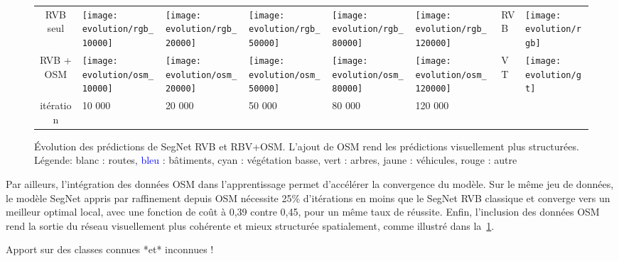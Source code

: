 \begin{figure}
\centering
\begin{tabularx}{0.95\textwidth}{c Y Y Y Y Y Y Y}
RVB seul &
\texttt{[image: evolution/rgb\_10000]} &
\texttt{[image: evolution/rgb\_20000]} &
\texttt{[image: evolution/rgb\_50000]} &
\texttt{[image: evolution/rgb\_80000]} &
\texttt{[image: evolution/rgb\_120000]} &
RVB &
\texttt{[image: evolution/rgb]} \\
RVB + OSM &
\texttt{[image: evolution/osm\_10000]} &
\texttt{[image: evolution/osm\_20000]} &
\texttt{[image: evolution/osm\_50000]} &
\texttt{[image: evolution/osm\_80000]} &
\texttt{[image: evolution/osm\_120000]} &
VT &
\texttt{[image: evolution/gt]} \\
itération & 10 000 & 20 000 & 50 000 & 80 000 & 120 000\\
\end{tabularx}
\caption{Évolution des prédictions de SegNet RVB et RBV+OSM. L'ajout de OSM rend les prédictions visuellement plus structurées.
\small{Légende: blanc : routes, \textcolor{Blue}{bleu} : bâtiments, \textcolor{Cerulean}{cyan} : végétation basse, \textcolor{OliveGreen}{vert} : arbres, \textcolor{Dandelion}{jaune} : véhicules, \textcolor{BrickRed}{rouge} : autre}}
\label{fig:training_evolution}
\end{figure}

Par ailleurs, l'intégration des données OSM dans l'apprentissage permet d'accélérer la convergence du modèle. Sur le même jeu de données, le modèle SegNet appris par raffinement depuis OSM nécessite 25\% d'itérations en moins que le SegNet RVB classique et converge vers un meilleur optimal local, avec une fonction de coût à 0,39 contre 0,45, pour un même taux de réussite. Enfin, l'inclusion des données OSM rend la sortie du réseau visuellement plus cohérente et mieux structurée spatialement, comme illustré dans la~\cref{fig:training_evolution}.

Apport sur des classes connues *et* inconnues !



